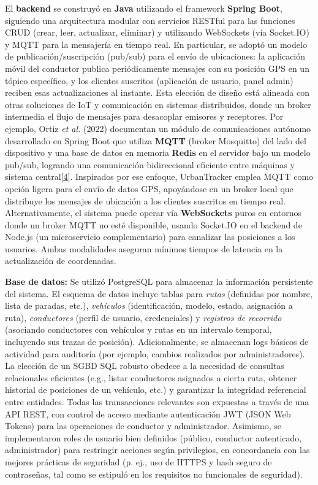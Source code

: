 \documentclass[
]{article}
\begin{document}
El \textbf{backend} se construyó en \textbf{Java} utilizando el
framework \textbf{Spring Boot}, siguiendo una arquitectura modular con
servicios RESTful para las funciones CRUD (crear, leer, actualizar,
eliminar) y utilizando WebSockets (vía Socket.IO) y MQTT para la
mensajería en tiempo real. En particular, se adoptó un modelo de
publicación/suscripción (pub/sub) para el envío de ubicaciones: la
aplicación móvil del conductor publica periódicamente mensajes con su
posición GPS en un tópico específico, y los clientes suscritos
(aplicación de usuario, panel admin) reciben esas actualizaciones al
instante. Esta elección de diseño está alineada con otras soluciones de
IoT y comunicación en sistemas distribuidos, donde un broker intermedia
el flujo de mensajes para desacoplar emisores y receptores. Por ejemplo,
Ortiz \emph{et al.} (2022) documentan un módulo de comunicaciones
autónomo desarrollado en Spring Boot que utiliza \textbf{MQTT} (broker
Mosquitto) del lado del dispositivo y una base de datos en memoria
\textbf{Redis} en el servidor bajo un modelo pub/sub, logrando una
comunicación bidireccional eficiente entre máquinas y sistema
central\href{https://bibliotecadigital.udea.edu.co/entities/publication/3eb20d8e-dece-489f-8bcc-89f009b482cf\#:~:text=entre\%20las\%20m\%C3\%A1quinas\%20y\%20el,logrando\%20as\%C3\%AD\%20una\%20comunicaci\%C3\%B3n\%20bidireccional}{{[}4{]}}.
Inspirados por ese enfoque, UrbanTracker emplea MQTT como opción ligera
para el envío de datos GPS, apoyándose en un broker local que distribuye
los mensajes de ubicación a los clientes suscritos en tiempo real.
Alternativamente, el sistema puede operar vía \textbf{WebSockets} puros
en entornos donde un broker MQTT no esté disponible, usando Socket.IO en
el backend de Node.js (un microservicio complementario) para canalizar
las posiciones a los usuarios. Ambas modalidades aseguran mínimos
tiempos de latencia en la actualización de coordenadas.

\textbf{Base de datos:} Se utilizó PostgreSQL para almacenar la
información persistente del sistema. El esquema de datos incluye tablas
para \emph{rutas} (definidas por nombre, lista de paradas, etc.),
\emph{vehículos} (identificación, modelo, estado, asignación a ruta),
\emph{conductores} (perfil de usuario, credenciales) y \emph{registros
de recorrido} (asociando conductores con vehículos y rutas en un
intervalo temporal, incluyendo sus trazas de posición). Adicionalmente,
se almacenan logs básicos de actividad para auditoría (por ejemplo,
cambios realizados por administradores). La elección de un SGBD SQL
robusto obedece a la necesidad de consultas relacionales eficientes
(e.g., listar conductores asignados a cierta ruta, obtener historial de
posiciones de un vehículo, etc.) y garantizar la integridad referencial
entre entidades. Todas las transacciones relevantes son expuestas a
través de una API REST, con control de acceso mediante autenticación JWT
(JSON Web Tokens) para las operaciones de conductor y administrador.
Asimismo, se implementaron roles de usuario bien definidos (público,
conductor autenticado, administrador) para restringir acciones según
privilegios, en concordancia con las mejores prácticas de seguridad (p.
ej., uso de HTTPS y hash seguro de contraseñas, tal como se estipuló en
los requisitos no funcionales de seguridad).
\end{document}
